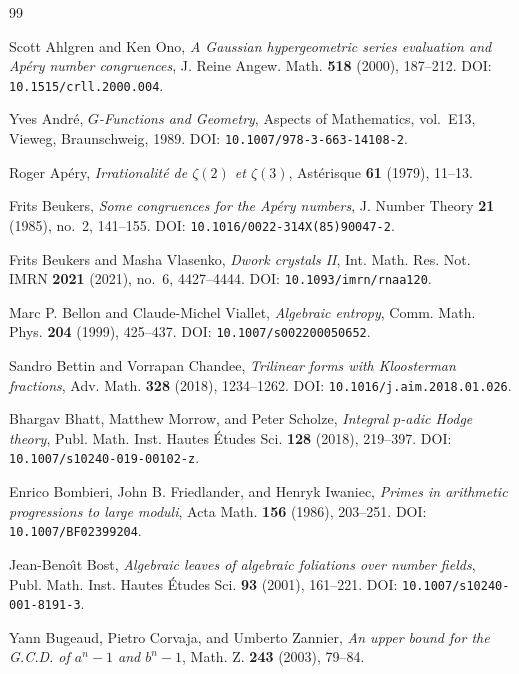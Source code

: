 \documentclass[11pt]{amsart}
\theoremstyle{plain}
\theoremstyle{remark}
\begin{document}
\begin{thebibliography}{99}
\raggedright

Scott Ahlgren and Ken Ono,
\emph{A Gaussian hypergeometric series evaluation and Ap\'ery number
congruences},
J. Reine Angew. Math. \textbf{518} (2000), 187--212.
DOI: \texttt{10.1515/crll.2000.004}.

Yves Andr\'e,
\emph{$G$-Functions and Geometry},
Aspects of Mathematics, vol.~E13, Vieweg, Braunschweig, 1989.
DOI: \texttt{10.1007/978-3-663-14108-2}.

Roger Ap\'ery,
\emph{Irrationalit\'e de $\zeta(2)$ et $\zeta(3)$},
Ast\'erisque \textbf{61} (1979), 11--13.

Frits Beukers,
\emph{Some congruences for the Ap\'ery numbers},
J. Number Theory \textbf{21} (1985), no.~2, 141--155.
DOI: \texttt{10.1016/0022-314X(85)90047-2}.

Frits Beukers and Masha Vlasenko,
\emph{Dwork crystals II},
Int. Math. Res. Not. IMRN \textbf{2021} (2021), no.~6, 4427--4444.
DOI: \texttt{10.1093/imrn/rnaa120}.

Marc P. Bellon and Claude-Michel Viallet,
\emph{Algebraic entropy},
Comm. Math. Phys. \textbf{204} (1999), 425--437.
DOI: \texttt{10.1007/s002200050652}.

Sandro Bettin and Vorrapan Chandee,
\emph{Trilinear forms with Kloosterman fractions},
Adv. Math. \textbf{328} (2018), 1234--1262.
DOI: \texttt{10.1016/j.aim.2018.01.026}.

Bhargav Bhatt, Matthew Morrow, and Peter Scholze,
\emph{Integral $p$-adic Hodge theory},
Publ. Math. Inst. Hautes \'Etudes Sci. \textbf{128} (2018), 219--397.
DOI: \texttt{10.1007/s10240-019-00102-z}.

Enrico Bombieri, John B. Friedlander, and Henryk Iwaniec,
\emph{Primes in arithmetic progressions to large moduli},
Acta Math. \textbf{156} (1986), 203--251.
DOI: \texttt{10.1007/BF02399204}.

Jean-Beno\^\i t Bost,
\emph{Algebraic leaves of algebraic foliations over number fields},
Publ. Math. Inst. Hautes \'Etudes Sci. \textbf{93} (2001), 161--221.
DOI: \texttt{10.1007/s10240-001-8191-3}.

Yann Bugeaud, Pietro Corvaja, and Umberto Zannier,
\emph{An upper bound for the G.C.D. of $a^n-1$ and $b^n-1$},
Math. Z. \textbf{243} (2003), 79--84.


\end{thebibliography}
\end{document}

